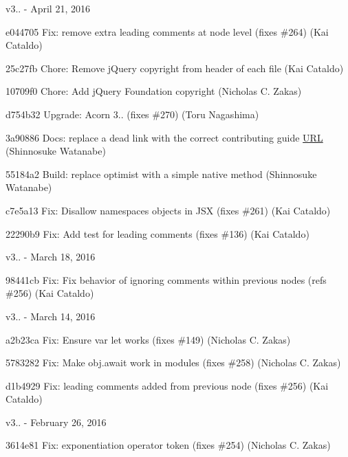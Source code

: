 v3.. -\/ April 21, 2016


\begin{DoxyItemize}
\item e044705 Fix\+: remove extra leading comments at node level (fixes \#264) (Kai Cataldo)
\item 25c27fb Chore\+: Remove j\+Query copyright from header of each file (Kai Cataldo)
\item 10709f0 Chore\+: Add j\+Query Foundation copyright (Nicholas C. Zakas)
\item d754b32 Upgrade\+: Acorn 3.. (fixes \#270) (Toru Nagashima)
\item 3a90886 Docs\+: replace a dead link with the correct contributing guide \mbox{\hyperlink{namespace_u_r_l}{U\+RL}} (Shinnosuke Watanabe)
\item 55184a2 Build\+: replace optimist with a simple native method (Shinnosuke Watanabe)
\item c7e5a13 Fix\+: Disallow namespaces objects in J\+SX (fixes \#261) (Kai Cataldo)
\item 22290b9 Fix\+: Add test for leading comments (fixes \#136) (Kai Cataldo)
\end{DoxyItemize}

v3.. -\/ March 18, 2016


\begin{DoxyItemize}
\item 98441cb Fix\+: Fix behavior of ignoring comments within previous nodes (refs \#256) (Kai Cataldo)
\end{DoxyItemize}

v3.. -\/ March 14, 2016


\begin{DoxyItemize}
\item a2b23ca Fix\+: Ensure \textquotesingle{}var let\textquotesingle{} works (fixes \#149) (Nicholas C. Zakas)
\item 5783282 Fix\+: Make obj.\+await work in modules (fixes \#258) (Nicholas C. Zakas)
\item d1b4929 Fix\+: leading comments added from previous node (fixes \#256) (Kai Cataldo)
\end{DoxyItemize}

v3.. -\/ February 26, 2016


\begin{DoxyItemize}
\item 3614e81 Fix\+: exponentiation operator token (fixes \#254) (Nicholas C. Zakas)
\end{DoxyItemize}

